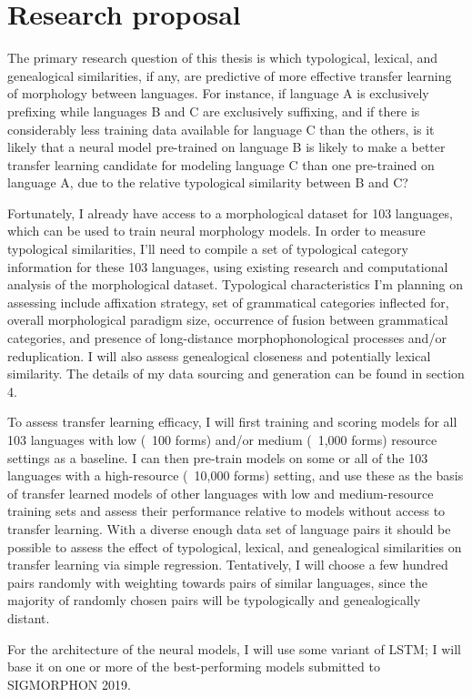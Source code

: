 \chapter{Research proposal}

The primary research question of this thesis is which typological, lexical, and genealogical similarities, if any, are predictive of more effective transfer learning of morphology between languages. For instance, if language A is exclusively prefixing while languages B and C are exclusively suffixing, and if there is considerably less training data available for language C than the others, is it likely that a neural model pre-trained on language B is likely to make a better transfer learning candidate for modeling language C than one pre-trained on language A, due to the relative typological similarity between B and C?

Fortunately, I already have access to a morphological dataset for 103 languages, which can be used to train neural morphology models. In order to measure typological similarities, I'll need to compile a set of typological category information for these 103 languages, using existing research and computational analysis of the morphological dataset. Typological characteristics I'm planning on assessing include affixation strategy, set of grammatical categories inflected for, overall morphological paradigm size, occurrence of fusion between grammatical categories, and presence of long-distance morphophonological processes and/or reduplication. I will also assess genealogical closeness and potentially lexical similarity. The details of my data sourcing and generation can be found in section 4.

To assess transfer learning efficacy, I will first training and scoring models for all 103 languages with low (~100 forms) and/or medium (~1,000 forms) resource settings as a baseline. I can then pre-train models on some or all of the 103 languages with a high-resource (~10,000 forms) setting, and use these as the basis of transfer learned models of other languages with low and medium-resource training sets and assess their performance relative to models without access to transfer learning. With a diverse enough data set of language pairs it should be possible to assess the effect of typological, lexical, and genealogical similarities on transfer learning via simple regression. Tentatively, I will choose a few hundred pairs randomly with weighting towards pairs of similar languages, since the majority of randomly chosen pairs will be typologically and genealogically distant.

For the architecture of the neural models, I will use some variant of LSTM; I will base it on one or more of the best-performing models submitted to SIGMORPHON 2019.